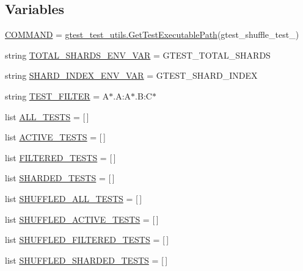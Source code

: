 \subsection*{Variables}
\begin{DoxyCompactItemize}
\item 
\hyperlink{namespacegtest__shuffle__test_a33b8a2fc24ccd6476d1e27b084142a25}{C\+O\+M\+M\+A\+ND} = \hyperlink{namespacegtest__test__utils_a89ed3717984a80ffbb7a9c92f71b86a2}{gtest\+\_\+test\+\_\+utils.\+Get\+Test\+Executable\+Path}(\textquotesingle{}gtest\+\_\+shuffle\+\_\+test\+\_\+\textquotesingle{})
\item 
string \hyperlink{namespacegtest__shuffle__test_a29088c2bb51a4550fa2a668d972f973a}{T\+O\+T\+A\+L\+\_\+\+S\+H\+A\+R\+D\+S\+\_\+\+E\+N\+V\+\_\+\+V\+AR} = \textquotesingle{}G\+T\+E\+S\+T\+\_\+\+T\+O\+T\+A\+L\+\_\+\+S\+H\+A\+R\+DS\textquotesingle{}
\item 
string \hyperlink{namespacegtest__shuffle__test_ab3215c444f0e35ae2764f862194fe743}{S\+H\+A\+R\+D\+\_\+\+I\+N\+D\+E\+X\+\_\+\+E\+N\+V\+\_\+\+V\+AR} = \textquotesingle{}G\+T\+E\+S\+T\+\_\+\+S\+H\+A\+R\+D\+\_\+\+I\+N\+D\+EX\textquotesingle{}
\item 
string \hyperlink{namespacegtest__shuffle__test_ac2a2a6c7c009be4f94bc9c8bc0c51bb5}{T\+E\+S\+T\+\_\+\+F\+I\+L\+T\+ER} = \textquotesingle{}A$\ast$.A\+:A$\ast$.B\+:C$\ast$\textquotesingle{}
\item 
list \hyperlink{namespacegtest__shuffle__test_aede96442ff7a7c9ac9a8baaaeb48e86c}{A\+L\+L\+\_\+\+T\+E\+S\+TS} = \mbox{[}$\,$\mbox{]}
\item 
list \hyperlink{namespacegtest__shuffle__test_acd6d827819dcc06b9bf061cd4849b082}{A\+C\+T\+I\+V\+E\+\_\+\+T\+E\+S\+TS} = \mbox{[}$\,$\mbox{]}
\item 
list \hyperlink{namespacegtest__shuffle__test_a35011532d6bd14ac29c891111ce1a911}{F\+I\+L\+T\+E\+R\+E\+D\+\_\+\+T\+E\+S\+TS} = \mbox{[}$\,$\mbox{]}
\item 
list \hyperlink{namespacegtest__shuffle__test_ad9bd126c3dc9894a3977a907e97e71e8}{S\+H\+A\+R\+D\+E\+D\+\_\+\+T\+E\+S\+TS} = \mbox{[}$\,$\mbox{]}
\item 
list \hyperlink{namespacegtest__shuffle__test_a6128f9c522f40c64ffb3917ff17080b8}{S\+H\+U\+F\+F\+L\+E\+D\+\_\+\+A\+L\+L\+\_\+\+T\+E\+S\+TS} = \mbox{[}$\,$\mbox{]}
\item 
list \hyperlink{namespacegtest__shuffle__test_ac3bfd4eae8e6f35a83e73cfd9d9611d5}{S\+H\+U\+F\+F\+L\+E\+D\+\_\+\+A\+C\+T\+I\+V\+E\+\_\+\+T\+E\+S\+TS} = \mbox{[}$\,$\mbox{]}
\item 
list \hyperlink{namespacegtest__shuffle__test_aa9502dcb42a1d690d17558cc71388e45}{S\+H\+U\+F\+F\+L\+E\+D\+\_\+\+F\+I\+L\+T\+E\+R\+E\+D\+\_\+\+T\+E\+S\+TS} = \mbox{[}$\,$\mbox{]}
\item 
list \hyperlink{namespacegtest__shuffle__test_a3603885677e36438fd2d7521db51bcb4}{S\+H\+U\+F\+F\+L\+E\+D\+\_\+\+S\+H\+A\+R\+D\+E\+D\+\_\+\+T\+E\+S\+TS} = \mbox{[}$\,$\mbox{]}
\end{DoxyCompactItemize}


